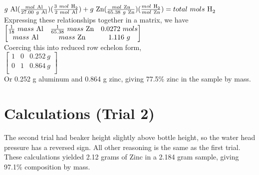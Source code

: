 \documentclass[11pt,letterpaper]{report}
\begin{document}
\noindent $g\ \ce{Al}(\frac{mol\ \ce{Al}}{27.00\ g\ \ce{Al}})(\frac{3\ mol\ \ce{H2}}{2\ mol\ \ce{Al}})
 + g\ \ce{Zn}(\frac{mol\ \ce{Zn}}{65.38\ g\ \ce{Zn}})(\frac{mol\ \ce{H2}}{mol\ \ce{Zn}}) = total\ mols\ \ce{H2}$ \\[0.3cm]

\noindent Expressing these relationships together in a matrix, we have \\

\noindent $\begin{bmatrix}
  \frac{1}{18}\ mass\ \ce{Al} & \frac{1}{65.38}\ mass\ \ce{Zn} &  0.0272\ mols \\
  mass\ \ce{Al} & mass\ \ce{Zn} & 1.116\ g \\
\end{bmatrix}$\\[0.3cm]

\noindent Coercing this into reduced row echelon form, \\

\noindent $\begin{bmatrix}
  1 & 0 & 0.252\ g \\
  0 & 1 & 0.864\ g \\
\end{bmatrix}$\\[0.3cm]

\noindent Or 0.252 g aluminum and 0.864 g zinc, giving 77.5\% zinc in the sample by mass.

\section*{Calculations (Trial 2)}

The second trial had beaker height slightly above bottle height, so the water head pressure has a reversed sign. All other reasoning is the same as the first trial. These calculations yielded 2.12 grams of Zinc in a 2.184 gram sample, giving  97.1\% composition by mass.
\end{document}

